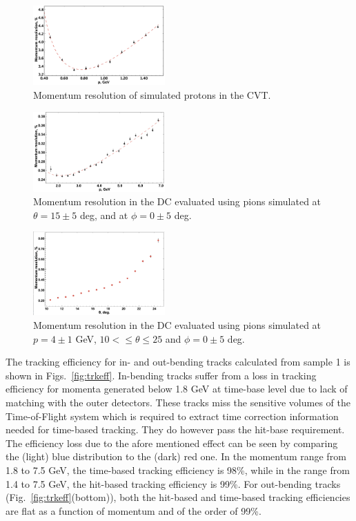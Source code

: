 \begin{figure}
\includegraphics[width=0.45\textwidth]{pics/fddegipekmpjjiho.png}
\caption{Momentum resolution of simulated protons in the CVT.  
}
\label{fig:respcvt}
\end{figure}
\begin{figure}
\includegraphics[width=0.45\textwidth]{pics/DCRes.png}
\caption{Momentum resolution in the DC evaluated using pions  simulated at $\theta =15\pm 5$ deg, and at $\phi = 0 \pm 5$ deg.
}
\label{fig:respdc}
\end{figure}

\begin{figure}
\includegraphics[width=0.45\textwidth]{pics/DCRes2.png}
\caption{Momentum resolution in the DC evaluated using  pions  simulated at $p=4\pm 1$ GeV, $10<\leq \theta\leq 25$ and $\phi = 0 \pm 5$ deg.
}
\label{fig:restheta}
\end{figure}

The tracking efficiency for in- and out-bending tracks calculated from sample 1 is shown in  Figs.~\ref{fig:trkeff}.  In-bending tracks suffer from a loss in tracking efficiency for momenta generated below 1.8 GeV at time-base level due to lack of matching with the outer detectors.  These tracks miss the sensitive volumes of the Time-of-Flight system which is required to extract time correction information needed for time-based tracking.  They do however pass the hit-base requirement.  The efficiency loss due to the afore mentioned effect can be seen by comparing the (light) blue distribution to the (dark) red one.  In the momentum range from 1.8 to 7.5 GeV, the time-based tracking efficiency is 98\%, while in the range from 1.4 to 7.5 GeV, the hit-based tracking efficiency is 99\%.  For out-bending tracks (Fig.~\ref{fig:trkeff}(bottom)), both the hit-based and time-based tracking efficiencies are flat as a function of momentum and of the order of 99\%. 


